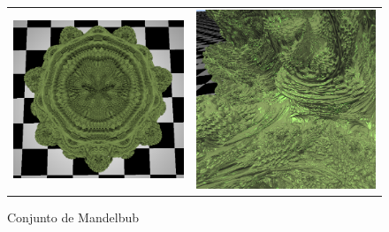 \begin{figure}[ht]
\begin{tabular}{cc}
    \includegraphics[scale=0.35]{img/C8/mandelbub-3.png} &     \includegraphics[scale=0.31]{img/C8/mandelbub-4.png} \\
    \end{tabular}
    \caption{Conjunto de Mandelbub}
    \label{fig:mandelbub}
\end{figure}

